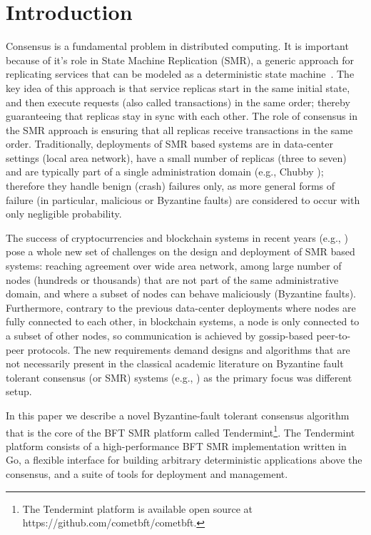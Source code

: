 \section{Introduction} \label{sec:tendermint}

Consensus is a fundamental problem in distributed computing. It
is important because of it's role in State Machine Replication (SMR), a generic
approach for replicating services that can be modeled as a deterministic state
machine~\cite{Lam78:cacm, Sch90:survey}. The key idea of this approach is that
service replicas start in the same initial state, and then execute requests
(also called transactions) in the same order; thereby guaranteeing that
replicas stay in sync with each other. The role of consensus in the SMR
approach is ensuring that all replicas receive transactions in the same order.
Traditionally, deployments of SMR based systems are in data-center settings
(local area network), have a small number of replicas (three to seven) and are
typically part of a single administration domain (e.g., Chubby
\cite{Bur:osdi06}); therefore they handle benign (crash) failures only, as more
general forms of failure (in particular, malicious or Byzantine faults) are
considered to occur with only negligible probability.  

The success of cryptocurrencies and blockchain systems in recent years (e.g.,
\cite{Nak2012:bitcoin, But2014:ethereum}) pose a whole new set of challenges on
the design and deployment of SMR based systems: reaching agreement over wide
area network, among large number of nodes (hundreds or thousands) that are not
part of the same administrative domain, and where a subset of nodes can behave
maliciously (Byzantine faults). Furthermore, contrary to the previous
data-center deployments where nodes are fully connected to each other, in
blockchain systems, a node is only connected to a subset of other nodes, so
communication is achieved by gossip-based peer-to-peer protocols. 
The new requirements demand designs and algorithms that are not necessarily
present in the classical academic literature on Byzantine fault tolerant
consensus (or SMR) systems (e.g., \cite{DLS88:jacm, CL02:tcs}) as the primary 
focus was different setup. 

In this paper we describe a novel Byzantine-fault tolerant consensus algorithm
that is the core of the BFT SMR platform called Tendermint\footnote{The
	Tendermint platform is available open source at
	https://github.com/cometbft/cometbft.}. The Tendermint platform consists of
a high-performance BFT SMR implementation written in Go, a flexible interface
for
building arbitrary deterministic applications above the consensus, and a suite
of tools for deployment and management.  


